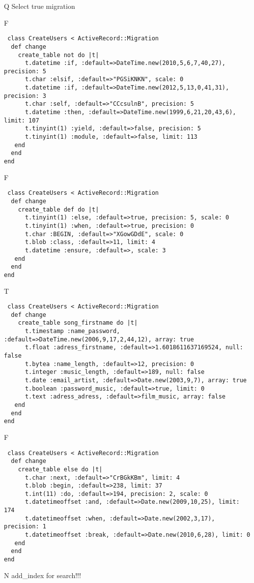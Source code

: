 Q
Select true migration

F
\begin{verbatim}
 class CreateUsers < ActiveRecord::Migration 
  def change 
    create_table not do |t| 
      t.datetime :if, :default=>DateTime.new(2010,5,6,7,40,27), precision: 5
      t.char :elsif, :default=>"PGSiKNKN", scale: 0
      t.datetime :if, :default=>DateTime.new(2012,5,13,0,41,31), precision: 3
      t.char :self, :default=>"CCcsulnB", precision: 5
      t.datetime :then, :default=>DateTime.new(1999,6,21,20,43,6), limit: 107
      t.tinyint(1) :yield, :default=>false, precision: 5
      t.tinyint(1) :module, :default=>false, limit: 113
   end 
  end 
end
\end{verbatim}

F
\begin{verbatim}
 class CreateUsers < ActiveRecord::Migration 
  def change 
    create_table def do |t| 
      t.tinyint(1) :else, :default=>true, precision: 5, scale: 0
      t.tinyint(1) :when, :default=>true, precision: 0
      t.char :BEGIN, :default=>"XGowGDdE", scale: 0
      t.blob :class, :default=>11, limit: 4
      t.datetime :ensure, :default=>, scale: 3
   end 
  end 
end
\end{verbatim}

T
\begin{verbatim}
 class CreateUsers < ActiveRecord::Migration 
  def change 
    create_table song_firstname do |t| 
      t.timestamp :name_password, :default=>DateTime.new(2006,9,17,2,44,12), array: true
      t.float :adress_firstname, :default=>1.6018611637169524, null: false
      t.bytea :name_length, :default=>12, precision: 0
      t.integer :music_length, :default=>189, null: false
      t.date :email_artist, :default=>Date.new(2003,9,7), array: true
      t.boolean :password_music, :default=>true, limit: 0
      t.text :adress_adress, :default=>film_music, array: false
   end 
  end 
end
\end{verbatim}

F
\begin{verbatim}
 class CreateUsers < ActiveRecord::Migration 
  def change 
    create_table else do |t| 
      t.char :next, :default=>"CrBGkKBm", limit: 4
      t.blob :begin, :default=>238, limit: 37
      t.int(11) :do, :default=>194, precision: 2, scale: 0
      t.datetimeoffset :and, :default=>Date.new(2009,10,25), limit: 174
      t.datetimeoffset :when, :default=>Date.new(2002,3,17), precision: 1
      t.datetimeoffset :break, :default=>Date.new(2010,6,28), limit: 0
   end 
  end 
end
\end{verbatim}
N
add_index for search!!!
  
